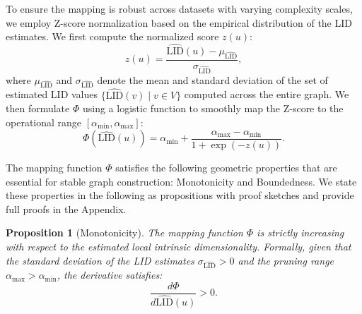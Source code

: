 \documentclass{article}
\theoremstyle{plain}
\newtheorem{proposition}[theorem]{Proposition}
\theoremstyle{definition}
\theoremstyle{remark}
\begin{document}
To ensure the mapping is robust across datasets with varying complexity scales, we employ Z-score normalization based on the empirical distribution of the LID estimates. We first compute the normalized score $z(u)$:
\begin{equation}
    z(u) = \frac{\widehat{\text{LID}}(u) - \mu_{\widehat{\text{LID}}}}{\sigma_{\widehat{\text{LID}}}},
\end{equation}
where $\mu_{\widehat{\text{LID}}}$ and $\sigma_{\widehat{\text{LID}}}$ denote the mean and standard deviation of the set of estimated LID values $\{ \widehat{\text{LID}}(v) \mid v \in V \}$ computed across the entire graph.
We then formulate $\Phi$ using a logistic function to smoothly map the Z-score to the operational range $[\alpha_{\min}, \alpha_{\max}]$:
\begin{equation}
    \Phi(\widehat{\text{LID}}(u)) = \alpha_{\min} + \frac{\alpha_{\max} - \alpha_{\min}}{1 + \exp(-z(u))}.
\end{equation}


The mapping function $\Phi$ satisfies the following geometric properties that are essential for stable graph construction: Monotonicity and Boundedness. We state these properties in the following as propositions with proof sketches and provide full proofs in the Appendix.

\begin{proposition}[Monotonicity]
\label{prop:monotonicity}
The mapping function $\Phi$ is strictly increasing with respect to the estimated local intrinsic dimensionality. Formally, given that the standard deviation of the LID estimates $\sigma_{\widehat{\text{LID}}} > 0$ and the pruning range $\alpha_{\max} > \alpha_{\min}$, the derivative satisfies:
\begin{equation}
    \frac{d \Phi}{d \widehat{\text{LID}}(u)} > 0.
\end{equation}
\end{proposition}
\end{document}
